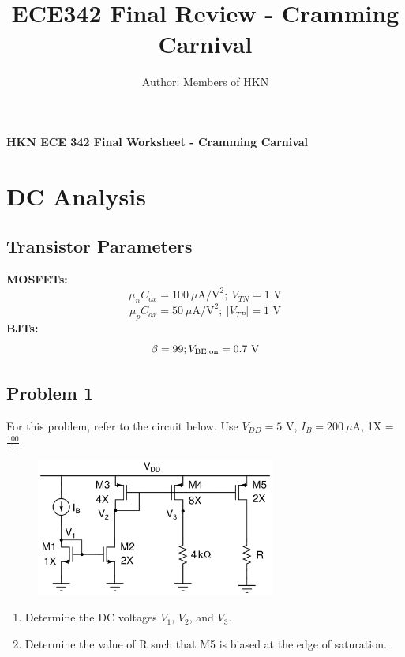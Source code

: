 \documentclass{article}
\title{ECE342 Final Review - Cramming Carnival}
\author{Author: Members of HKN}
\date{}
\begin{document}
\begin{center}
\textbf{
{\Large HKN ECE 342 Final Worksheet - Cramming Carnival}
}
\end{center} 
\noindent\makebox[\linewidth]{\rule{\linewidth}{0.2pt}}
\section*{DC Analysis}
\subsection*{Transistor Parameters}
\textbf{MOSFETs:}
$$\mu_nC_{ox} = 100\:\mu \text{A/V}^2; \ V_{TN} = 1\text{ V}$$
$$\mu_pC_{ox} = 50\:\mu \text{A/V}^2; \ |V_{TP}| = 1\text{ V}$$
\textbf{BJTs:}
$$\beta = 99; V_{\rm BE, on} = 0.7\text{ V}$$
\subsection*{Problem 1}
For this problem, refer to the circuit below. Use $V_{DD} = 5$ V, $I_B = 200\ \mu$A, 1X = $\frac{100}{1}$.
\begin{figure}[!htb]
\begin{center}
    \includegraphics[width=0.7\textwidth]{figures/cc_dc_2 (1).jpg}
\end{center}
\end{figure}
\begin{enumerate}[label=\textbf{(\alph*)}]
    \item Determine the DC voltages $V_1$, $V_2$, and $V_3$.
    \item Determine the value of R such that M5 is biased at the edge of saturation.
\end{enumerate}
\newpage
\end{document}

